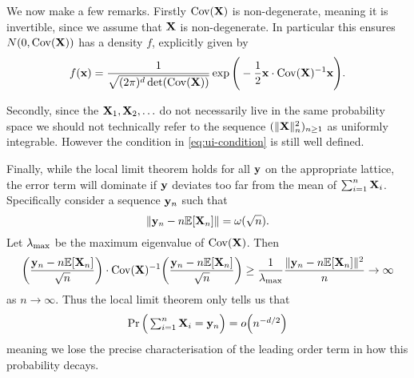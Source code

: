 We now make a few remarks. Firstly $\operatorname{Cov}({\mathbf X})$ is non-degenerate, meaning it is invertible, since we assume that ${\mathbf X}$ is non-degenerate. In particular this ensures $N(0, \operatorname{Cov}({\mathbf X}))$ has a density $f$, explicitly given by
\begin{equation*}
    f({\mathbf x}) = \frac{1}{\sqrt{(2 \pi)^d \det(\operatorname{Cov}({\mathbf X}))}}
    \exp \Bigg(
        -\frac{1}{2} {\mathbf x} \cdot \operatorname{Cov}({\mathbf X})^{-1} {\mathbf x}
        \Bigg).
\end{equation*}

Secondly, since the ${\mathbf X}_1, {\mathbf X}_2, \ldots$ do not necessarily live in the same probability space we should not technically refer to the sequence $(\lVert{\mathbf X}\rVert_n^2)_{n \geq 1}$ as uniformly integrable. However the condition in \cref{eq:ui-condition} is still well defined.

Finally, while the local limit theorem holds for all ${\mathbf y}$ on the appropriate lattice, the error term will dominate if ${\mathbf y}$ deviates too far from the mean of $\sum_{i=1}^n {\mathbf X}_i$. Specifically consider a sequence ${\mathbf y}_n$ such that
\begin{equation*}
    \lVert{\mathbf y}_n - n {\mathbb E}[{\mathbf X}_n]\rVert = \omega(\sqrt{n}).
\end{equation*}
Let ${\lambda_{\text{max}}}$ be the maximum eigenvalue of $\operatorname{Cov}({\mathbf X})$. Then
\begin{equation*}
    \bigg( \frac{{\mathbf y}_n - n {\mathbb E}[{\mathbf X}_n]}{\sqrt{n}} \bigg)
    \cdot \operatorname{Cov}({\mathbf X})^{-1} 
    \bigg( \frac{{\mathbf y}_n - n {\mathbb E}[{\mathbf X}_n]}{\sqrt{n}} \bigg)
    \geq \frac{1}{{\lambda_{\text{max}}}} \frac{\lVert{\mathbf y}_n - n{\mathbb E}[{\mathbf X}_n]\rVert^2}{n} \to \infty
\end{equation*}
as $n \to \infty$. Thus the local limit theorem only tells us that 
\begin{equation*}
    \Pr\Big( \textstyle \sum_{i=1}^n {\mathbf X}_i = {\mathbf y}_n \Big) = o\Big( n^{-d/2} \Big)
\end{equation*}
meaning we lose the precise characterisation of the leading order term in how this probability decays.

